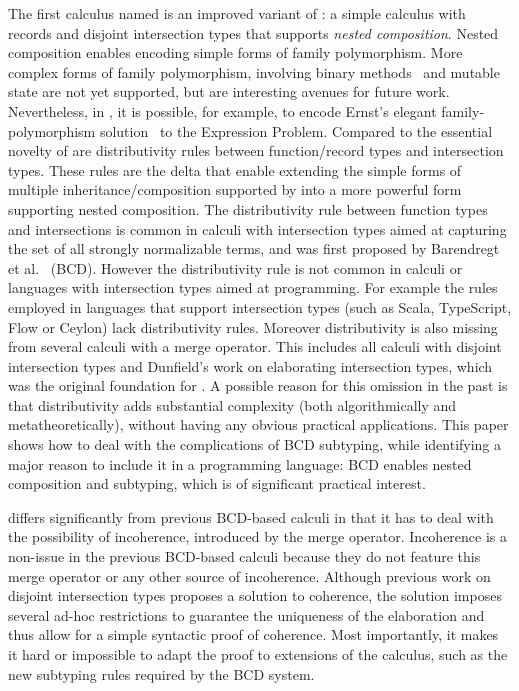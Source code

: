 The first calculus named \namee is an improved variant of \oname: a simple calculus
with records and disjoint intersection types that supports \emph{nested
  composition}. Nested composition enables encoding simple forms of family
polymorphism. More complex forms of family polymorphism, involving binary
methods~\citep{bruce1995binary} and mutable state are not yet supported, but are
interesting avenues for future work. Nevertheless, in \namee, it is possible, for
example, to encode Ernst's elegant family-polymorphism
solution~\citep{Ernst_2001} to the Expression Problem. Compared to \oname the
essential novelty of \namee are distributivity rules between function/record
types and intersection types. These rules are the delta that enable extending
the simple forms of multiple inheritance/composition supported by \oname into a
more powerful form supporting nested composition. The distributivity rule
between function types and intersections is common in calculi with intersection
types aimed at capturing the set of all strongly normalizable terms, and was
first proposed by Barendregt et al.~\citep{Barendregt_1983} (BCD). However the
distributivity rule is not common in calculi or languages with intersection
types aimed at programming. For example the rules employed in languages that
support intersection types (such as Scala, TypeScript, Flow or Ceylon) lack
distributivity rules. Moreover distributivity is also missing from several
calculi with a merge operator. This includes all calculi with disjoint
intersection types and Dunfield's work on elaborating intersection types, which
was the original foundation for \oname. A possible reason for this omission in
the past is that distributivity adds substantial complexity (both
algorithmically and metatheoretically), without having any obvious practical
applications. This paper shows how to deal with the complications of BCD
subtyping, while identifying a major reason to include it in a programming
language: BCD enables nested composition and subtyping, which is of significant
practical interest.


\namee differs significantly from previous BCD-based calculi in that it has to
deal with the possibility of incoherence, introduced by the merge operator. Incoherence
is a non-issue in the previous BCD-based calculi because they do not feature
this merge operator or any other source of incoherence.
Although previous work on disjoint intersection types
proposes a solution to coherence, the solution imposes several ad-hoc restrictions
to guarantee the uniqueness of the elaboration and thus allow for a simple
syntactic proof of coherence. Most
importantly, it makes it hard or impossible to adapt the proof to extensions of
the calculus, such as the new subtyping rules required by the BCD system.

